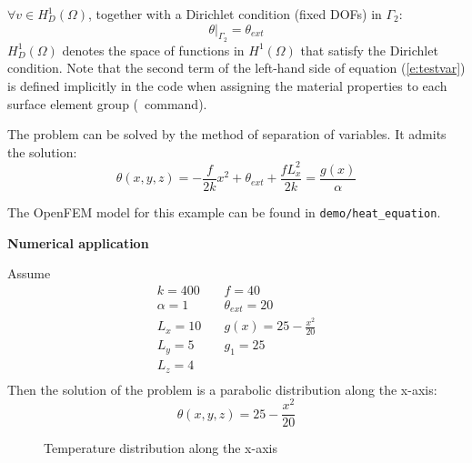 $\forall v \in H^1_D(\Omega)$, together with a Dirichlet condition (fixed DOFs) in $\Gamma_2$: 
$$ \theta \vert_{\Gamma_2} = \theta_{ext} $$
$H^1_D(\Omega)$ denotes the space of functions in $H^1(\Omega)$ that satisfy the Dirichlet condition.
Note that the second term of the left-hand side of equation (\ref{e:testvar}) is defined implicitly
in the code when assigning the material properties to each surface element group (\femesh\ command).

The problem can be solved by the method of separation of variables. It admits
the solution:
$$ \displaystyle \theta(x,y,z) =-\frac{f}{2 k} x^2 + \theta_{ext} + \frac{ f L_x^2}{2k} = \frac{g(x)}{\alpha}$$

The OpenFEM model for this example can be found in {\tt demo/heat\_equation}.

{\bf Numerical application }

\noindent Assume
\begin{equation}
\begin{array}{ll}
k=400 & \quad f=40\\
\alpha=1 & \quad \theta_{ext}=20\\
L_x=10 & \quad  \displaystyle g(x)=25-\frac{x^2}{20} \\
L_y=5 & \quad  g_1=25\\
L_z=4 & \\
\end{array}
\end{equation}
Then the solution of the problem is a parabolic distribution along the \mbox{x-axis:}
$$\displaystyle \theta(x,y,z)=25 - \frac{x^2}{20}$$
\begin{figure}
\centering %
\caption{Temperature distribution along the x-axis}
\label{fig:reg_temp_fin}
\end{figure}

